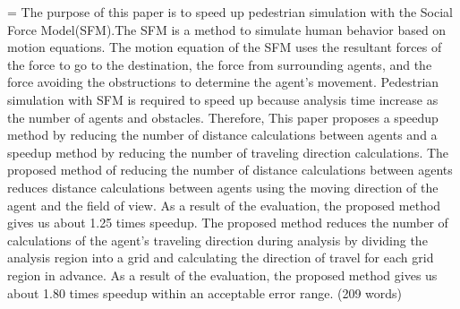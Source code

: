 %

={
The purpose of this paper is to speed up pedestrian simulation with the Social Force Model(SFM).The SFM is a method to simulate human behavior based on motion equations. The motion equation of the SFM uses the resultant forces of the force to go to the destination, the force from surrounding agents, and the force avoiding the obstructions to determine the agent’s movement. Pedestrian simulation with SFM is required to speed up because analysis time increase as the number of agents and obstacles. Therefore, This paper proposes a speedup method by reducing the number of distance calculations between agents and a speedup method by reducing the number of traveling direction calculations. The proposed method of reducing the number of distance calculations between agents reduces distance calculations between agents using the moving direction of the agent and the ﬁeld of view. As a result of the evaluation, the proposed method gives us about 1.25 times speedup. The proposed method reduces the number of calculations of the agent’s traveling direction during analysis by dividing the analysis region into a grid and calculating the direction of travel for each grid region in advance. As a result of the evaluation, the proposed method gives us about 1.80 times speedup within an acceptable error range.
(209 words)
}

